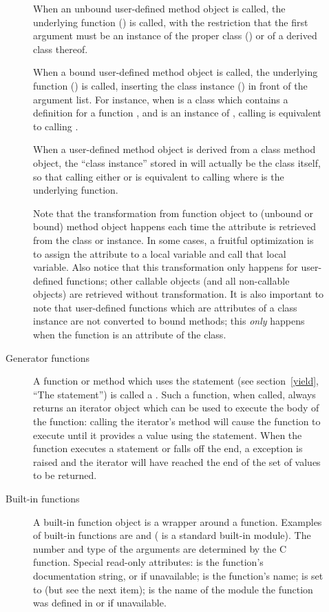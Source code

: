 \begin{description}
\begin{description}
When an unbound user-defined method object is called, the underlying
function () is called, with the restriction that the
first argument must be an instance of the proper class
() or of a derived class thereof.

When a bound user-defined method object is called, the underlying
function () is called, inserting the class instance
() in front of the argument list.  For instance, when
 is a class which contains a definition for a function
, and  is an instance of , calling
 is equivalent to calling .

When a user-defined method object is derived from a class method object,
the ``class instance'' stored in  will actually be the
class itself, so that calling either  or  is
equivalent to calling  where  is the underlying
function.

Note that the transformation from function object to (unbound or
bound) method object happens each time the attribute is retrieved from
the class or instance.  In some cases, a fruitful optimization is to
assign the attribute to a local variable and call that local variable.
Also notice that this transformation only happens for user-defined
functions; other callable objects (and all non-callable objects) are
retrieved without transformation.  It is also important to note that
user-defined functions which are attributes of a class instance are
not converted to bound methods; this \emph{only} happens when the
function is an attribute of the class.

\item[Generator functions\index{generator!function}\index{generator!iterator}]
A function or method which uses the  statement (see
section~\ref{yield}, ``The  statement'') is called a
.  Such a function, when called, always
returns an iterator object which can be used to execute the body of
the function:  calling the iterator's  method will
cause the function to execute until it provides a value using the
 statement.  When the function executes a
 statement or falls off the end, a
 exception is raised and the iterator will
have reached the end of the set of values to be returned.

\item[Built-in functions]
A built-in function object is a wrapper around a \C{} function.  Examples
of built-in functions are  and 
( is a standard built-in module).
The number and type of the arguments are
determined by the C function.
Special read-only attributes:  is the function's
documentation string, or  if unavailable; 
is the function's name;  is set to  (but see
the next item);  is the name of the module the
function was defined in or  if unavailable.


\end{description}
\end{description}
